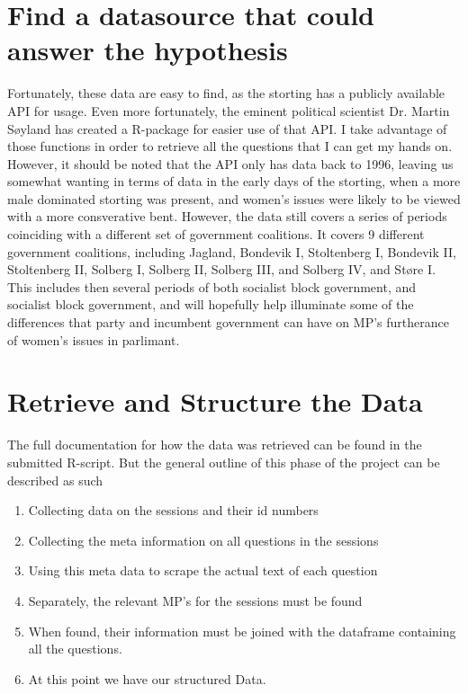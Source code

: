 \documentclass[12pt]{article}
\begin{document}
\section{Find a datasource that could answer the hypothesis}
Fortunately, these data are easy to find, as the storting has a publicly available API for usage. Even more fortunately, the eminent political scientist Dr. Martin Søyland has created a R-package for easier use of that API. I take advantage of those functions in order to retrieve all the questions that I can get my hands on. However, it should be noted that the API only has data back to 1996, leaving us somewhat wanting in terms of data in the early days of the storting, when a more male dominated storting was present, and women's issues were likely to be viewed with a more consverative bent. However, the data still covers a series of periods coinciding with a different set of government coalitions. It covers 9 different government coalitions, including Jagland, Bondevik I, Stoltenberg I, Bondevik II, Stoltenberg II, Solberg I, Solberg II, Solberg III, and Solberg IV, and Støre I. This includes then several periods of both socialist block government, and socialist block government, and will hopefully help illuminate some of the differences that party and incumbent government can have on MP's furtherance of women's issues in parlimant.

\section{Retrieve and Structure the Data}
The full documentation for how the data was retrieved can be found in the submitted R-script. But the general outline of this phase of the project can be described as such
\begin{enumerate}
	\item Collecting data on the sessions and their id numbers
	\item Collecting the meta information on all questions in the sessions
	\item Using this meta data to scrape the actual text of each question
	\item Separately, the relevant MP's for the sessions must be found
	\item When found, their information must be joined with the dataframe containing all the questions.
	\item At this point we have our structured Data.
\end{enumerate}
\end{document}
